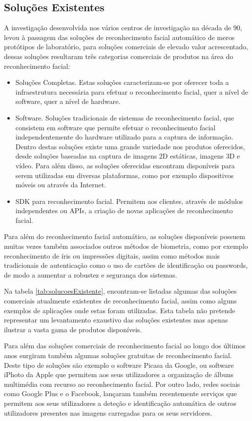 \subsection{Soluções Existentes}\label{sec:soluções}
A investigação desenvolvida nos vários centros de investigação na década de 90, levou à passagem das soluções de reconhecimento facial automático de meros protótipos de laboratório, para soluções comerciais de elevado valor acrescentado, dessas soluções resultaram três categorias comerciais de produtos na área do reconhecimento facial:
\begin{itemize}
\item Soluções Completas. Estas soluções caracterizam-se por oferecer toda a infraestrutura necessária para efetuar o reconhecimento facial, quer a nível de software, quer a nível de hardware.
\item Software. Soluções tradicionais de sistemas de reconhecimento facial, que consistem em software que permite efetuar o reconhecimento facial independentemente do hardware utilizado para a captura de informação.  Dentro destas soluções existe uma grande variedade nos produtos oferecidos, desde soluções baseadas na captura de imagens 2D estáticas, imagens 3D e vídeo. Para além disso, as soluções oferecidas encontram disponíveis para serem utilizadas em diversas plataformas, como por exemplo dispositivos móveis ou através da Internet.
\item SDK para reconhecimento facial. Permitem aos clientes, através de módulos independentes ou APIs, a criação de novas aplicações de reconhecimento facial.
\end{itemize}

Para além do reconhecimento facial automático, as soluções disponíveis possuem muitas vezes também associados outros métodos de biometria, como por exemplo reconhecimento de íris ou impressões digitais, assim como métodos mais tradicionais de autenticação como o uso de cartões de identificação ou passwords, de modo a aumentar a robustez e segurança dos sistemas.

Na tabela \ref{tab:solucoesExistente}, encontram-se listadas algumas das soluções comerciais atualmente existentes de reconhecimento facial, assim como alguns exemplos de aplicações onde estas foram utilizadas. Esta tabela não pretende representar um levantamento exaustivo das soluções existentes mas apenas ilustrar a vasta gama de produtos disponíveis.

Para além das soluções comerciais de reconhecimento facial ao longo dos últimos anos surgiram também algumas soluções gratuitas de reconhecimento facial. Deste tipo de soluções são exemplo o software Picasa da Google, ou software iPhoto da Apple que permitem aos seus utilizadores a organização de álbuns multimédia com recurso ao reconhecimento facial. Por outro lado, redes sociais como Google Plus e o Facebook, lançaram também recentemente serviços que permitem aos seus utilizadores a deteção e identificação automática de outros utilizadores presentes nas imagens carregadas para os seus servidores.


